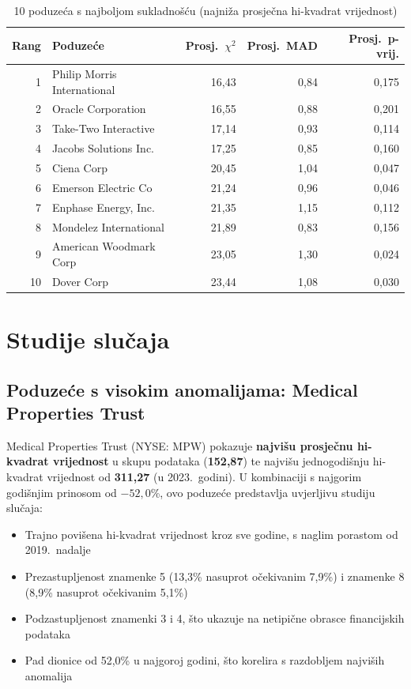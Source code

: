 \documentclass[12pt,a4paper]{article}
\begin{document}
\begin{table}[H]
\centering
\caption{10 poduzeća s najboljom sukladnošću (najniža prosječna hi-kvadrat vrijednost)}
\label{tab:conforming}
\begin{tabular}{rlrrr}
\toprule
\textbf{Rang} & \textbf{Poduzeće} & \textbf{Prosj.\ $\chi^2$} & \textbf{Prosj.\ MAD} & \textbf{Prosj.\ p-vrij.} \\
\midrule
1 & Philip Morris International & 16,43 & 0,84 & 0,175 \\
2 & Oracle Corporation & 16,55 & 0,88 & 0,201 \\
3 & Take-Two Interactive & 17,14 & 0,93 & 0,114 \\
4 & Jacobs Solutions Inc. & 17,25 & 0,85 & 0,160 \\
5 & Ciena Corp & 20,45 & 1,04 & 0,047 \\
6 & Emerson Electric Co & 21,24 & 0,96 & 0,046 \\
7 & Enphase Energy, Inc. & 21,35 & 1,15 & 0,112 \\
8 & Mondelez International & 21,89 & 0,83 & 0,156 \\
9 & American Woodmark Corp & 23,05 & 1,30 & 0,024 \\
10 & Dover Corp & 23,44 & 1,08 & 0,030 \\
\bottomrule
\end{tabular}
\end{table}

\newpage
\section{Studije slučaja}

\subsection{Poduzeće s visokim anomalijama: Medical Properties Trust}

Medical Properties Trust (NYSE: MPW) pokazuje \textbf{najvišu prosječnu hi-kvadrat vrijednost} u skupu podataka (\textbf{152,87}) te najvišu jednogodišnju hi-kvadrat vrijednost od \textbf{311,27} (u 2023.\ godini). U kombinaciji s najgorim godišnjim prinosom od $-52{,}0$\%, ovo poduzeće predstavlja uvjerljivu studiju slučaja:

\begin{itemize}
    \item Trajno povišena hi-kvadrat vrijednost kroz sve godine, s naglim porastom od 2019.\ nadalje
    \item Prezastupljenost znamenke 5 (13,3\% nasuprot očekivanim 7,9\%) i znamenke 8 (8,9\% nasuprot očekivanim 5,1\%)
    \item Podzastupljenost znamenki 3 i 4, što ukazuje na netipične obrasce financijskih podataka
    \item Pad dionice od 52,0\% u najgoroj godini, što korelira s razdobljem najviših anomalija
\end{itemize}
\end{document}
